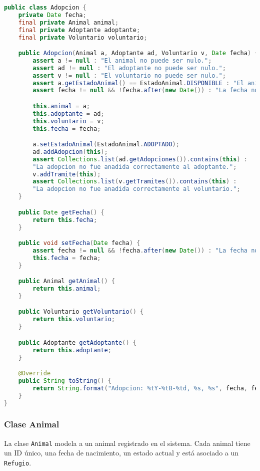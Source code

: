 \begin{lstlisting}[language=Java]
public class Adopcion {
    private Date fecha;
    final private Animal animal;
    final private Adoptante adoptante;
    final private Voluntario voluntario;

    public Adopcion(Animal a, Adoptante ad, Voluntario v, Date fecha) {
        assert a != null : "El animal no puede ser nulo.";
        assert ad != null : "El adoptante no puede ser nulo.";
        assert v != null : "El voluntario no puede ser nulo.";
        assert a.getEstadoAnimal() == EstadoAnimal.DISPONIBLE : "El animal debe estar disponible para adopcion.";
        assert fecha != null && !fecha.after(new Date()) : "La fecha no puede ser nula ni estar en el futuro.";

        this.animal = a;
        this.adoptante = ad;
        this.voluntario = v;
        this.fecha = fecha;

        a.setEstadoAnimal(EstadoAnimal.ADOPTADO);
        ad.addAdopcion(this);
        assert Collections.list(ad.getAdopciones()).contains(this) : 
        "La adopcion no fue anadida correctamente al adoptante.";
        v.addTramite(this);
        assert Collections.list(v.getTramites()).contains(this) : 
        "La adopcion no fue anadida correctamente al voluntario.";
    }

    public Date getFecha() {
        return this.fecha;
    }

    public void setFecha(Date fecha) {
        assert fecha != null && !fecha.after(new Date()) : "La fecha no puede ser nula ni estar en el futuro";
        this.fecha = fecha;
    }

    public Animal getAnimal() {
        return this.animal;
    }

    public Voluntario getVoluntario() {
        return this.voluntario;
    }

    public Adoptante getAdoptante() {
        return this.adoptante;
    }

    @Override
    public String toString() {
        return String.format("Adopcion: %tY-%tB-%td, %s, %s", fecha, fecha, fecha, animal, adoptante);
    }
}
\end{lstlisting}

\subsubsection{Clase Animal}
La clase \texttt{Animal} modela a un animal registrado en el sistema. Cada animal tiene un ID único, una fecha de nacimiento, un estado actual y está asociado a un \texttt{Refugio}.

